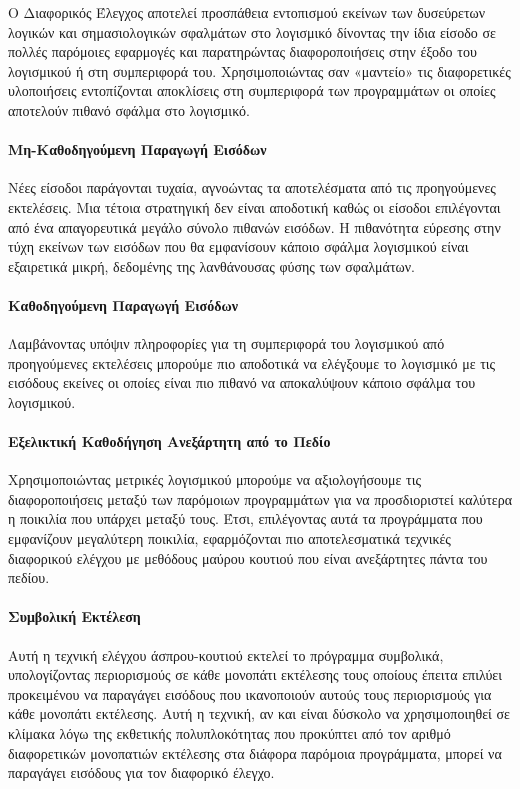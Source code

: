 \documentclass[12pt]{article}
\begin{document}
\par Ο Διαφορικός Έλεγχος αποτελεί προσπάθεια εντοπισμού εκείνων των δυσεύρετων λογικών και σημασιολογικών σφαλμάτων στο λογισμικό δίνοντας την ίδια είσοδο σε πολλές παρόμοιες εφαρμογές και παρατηρώντας διαφοροποιήσεις στην έξοδο του λογισμικού ή στη συμπεριφορά του. Χρησιμοποιώντας σαν «μαντείο» τις διαφορετικές υλοποιήσεις εντοπίζονται αποκλίσεις στη συμπεριφορά των προγραμμάτων οι οποίες αποτελούν πιθανό σφάλμα στο λογισμικό.

\cite{william}
\cite{wiki}

\paragraph{Μη-Καθοδηγούμενη Παραγωγή Εισόδων}
Νέες είσοδοι παράγονται τυχαία, αγνοώντας τα αποτελέσματα από τις προηγούμενες εκτελέσεις. Μια τέτοια στρατηγική δεν είναι αποδοτική καθώς οι είσοδοι επιλέγονται από ένα απαγορευτικά μεγάλο σύνολο πιθανών εισόδων. Η πιθανότητα εύρεσης στην τύχη εκείνων των εισόδων που θα εμφανίσουν κάποιο σφάλμα λογισμικού είναι εξαιρετικά μικρή, δεδομένης της λανθάνουσας φύσης των σφαλμάτων.

\paragraph{Καθοδηγούμενη Παραγωγή Εισόδων}
Λαμβάνοντας υπόψιν πληροφορίες για τη συμπεριφορά του λογισμικού από προηγούμενες εκτελέσεις μπορούμε πιο αποδοτικά να ελέγξουμε το λογισμικό με τις εισόδους εκείνες οι οποίες είναι πιο πιθανό να αποκαλύψουν κάποιο σφάλμα του λογισμικού.

\paragraph{Εξελικτική Καθοδήγηση Ανεξάρτητη από το Πεδίο}
Χρησιμοποιώντας μετρικές λογισμικού μπορούμε να αξιολογήσουμε τις διαφοροποιήσεις μεταξύ των παρόμοιων προγραμμάτων για να προσδιοριστεί καλύτερα η ποικιλία που υπάρχει μεταξύ τους. Έτσι, επιλέγοντας αυτά τα προγράμματα που εμφανίζουν μεγαλύτερη ποικιλία, εφαρμόζονται πιο αποτελεσματικά τεχνικές διαφορικού ελέγχου με μεθόδους μαύρου κουτιού που είναι ανεξάρτητες πάντα του πεδίου.

\paragraph{Συμβολική Εκτέλεση}
Αυτή η τεχνική ελέγχου άσπρου-κουτιού εκτελεί το πρόγραμμα συμβολικά, υπολογίζοντας περιορισμούς σε κάθε μονοπάτι εκτέλεσης τους οποίους έπειτα επιλύει προκειμένου να παραγάγει εισόδους που ικανοποιούν αυτούς τους περιορισμούς για κάθε μονοπάτι εκτέλεσης. Αυτή η τεχνική, αν και είναι δύσκολο να χρησιμοποιηθεί σε κλίμακα λόγω της εκθετικής πολυπλοκότητας που προκύπτει από τον αριθμό διαφορετικών μονοπατιών εκτέλεσης στα διάφορα παρόμοια προγράμματα, μπορεί να παραγάγει εισόδους για τον διαφορικό έλεγχο.
\end{document}
